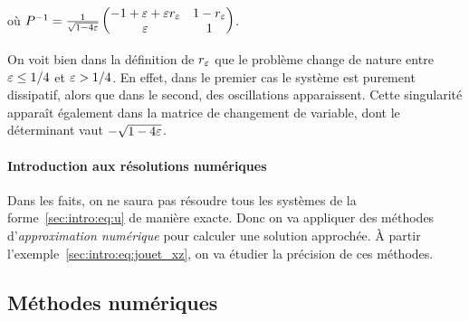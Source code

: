 où $P^{-1} = \frac{1}{\sqrt{1 - 4\varepsilon}} \begin{pmatrix}
    -1 + \varepsilon + \varepsilon r_{\varepsilon}  &  1 - r_{\varepsilon} \\
                \varepsilon         &      1
\end{pmatrix}$.
\begin{FRremark*}
    On voit bien dans la définition de $r_{\varepsilon}$ que le problème change de nature entre $\varepsilon \leq 1/4$ et $\varepsilon > 1/4$. En effet, dans le premier cas le système est purement dissipatif, alors que dans le second, des oscillations apparaissent. Cette singularité apparaît également dans la matrice de changement de variable, dont le déterminant vaut $-\sqrt{1 - 4\varepsilon}$.
\end{FRremark*}


\paragraph{Introduction aux résolutions numériques\\}
Dans les faits, on ne saura pas résoudre tous les systèmes de la forme~\eqref{sec:intro:eq:u} de manière exacte. Donc on va appliquer des méthodes d'\textit{approximation numérique} pour calculer une solution approchée. À partir l'exemple~\eqref{sec:intro:eq:jouet_xz}, on va étudier la précision de ces méthodes.








\subsection*{Méthodes numériques}

